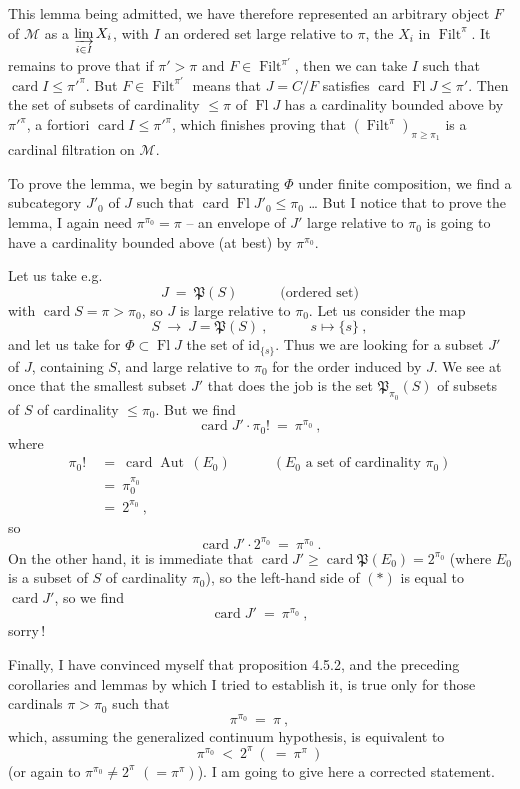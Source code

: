\documentclass[11pt]{article}
\newcommand{\printedpage}[1]{\marginpar{\footnotesize p.~#1}}
\newcommand{\msp}[1]{\marginpar{\footnotesize [#1]}}
\newcommand{\card}{\operatorname{card}}
\newcommand{\Fl}{\operatorname{Fl}}
\newcommand{\Filt}{\operatorname{Filt}}
\newcommand{\Aut}{\operatorname{Aut}}
\begin{document}
This lemma being admitted, we have therefore represented an arbitrary object $F$ of $\mathcal{M}$ as a $\varinjlim\limits_{i\in I} X_i$, with $I$ an ordered set large relative to $\pi$, the $X_i$ in $\Filt^{\pi}$. It remains to prove that if $\pi' > \pi$ and $F \in \Filt^{\pi'}$, then we can take $I$ such that $\card I \leqslant \pi'^{\pi}$. But $F \in \Filt^{\pi'}$ means that $J = C/F$ satisfies $\card\Fl J \leqslant \pi'$. Then the set of subsets of cardinality $\leqslant \pi$ of $\Fl J$ has a cardinality bounded above by $\pi'^{\pi}$, a fortiori $\card I \leqslant \pi'^{\pi}$, which finishes proving that $(\Filt^{\pi})_{\pi\geqslant\pi_1}$ is a cardinal filtration on $\mathcal{M}$.

\msp{page 114}

To prove the lemma, we begin by saturating $\Phi$ under finite composition, we find a subcategory $J'_0$ of $J$ such that $\card\Fl J'_0 \leqslant \pi_0$ \ldots{} But I notice that to prove the lemma, I again need $\pi^{\pi_0} = \pi$ -- an envelope of $J'$ large relative to $\pi_0$ is going to have a cardinality bounded above (at best) by $\pi^{\pi_0}$.

Let us take e.g.
\[
J \ =\ \mathfrak{P}(S) \qquad\quad \text{(ordered set)}
\]
with $\card S = \pi > \pi_0$, so $J$ is large relative to $\pi_0$. Let us consider the map
\[
S \ \longrightarrow\ J = \mathfrak{P}(S)\ , \qquad\quad s \longmapsto \{s\}\ ,
\]
and let us take for $\Phi \subset \Fl J$ the set of $\mathrm{id}_{\{s\}}$. Thus we are looking for a subset $J'$ of $J$, containing $S$, and large relative to $\pi_0$ for the order induced by $J$. We see at once that the smallest subset $J'$ that does the job is the set $\mathfrak{P}_{\pi_0}(S)$ of subsets of $S$ of cardinality $\leqslant \pi_0$. But we find
\[
\card J' \cdot \pi_0! \ =\ \pi^{\pi_0}\ ,
\]
\printedpage{33}
\msp{page 115}
where
\[
\begin{aligned}
\pi_0! \ &=\ \card\Aut\,(E_0) \qquad\quad (E_0 \text{ a set of cardinality } \pi_0)\\
&=\ \pi_0^{\pi_0}\\
&=\ 2^{\pi_0}\ ,
\end{aligned}
\]
so
\[
\card J' \cdot 2^{\pi_0} \ =\ \pi^{\pi_0}\ .
\tag*{$(*)$}
\]
On the other hand, it is immediate that $\card J' \geqslant \card\mathfrak{P}(E_0) = 2^{\pi_0}$ (where $E_0$ is a subset of $S$ of cardinality $\pi_0$), so the left-hand side of $(*)$ is equal to $\card J'$, so we find
\[
\card J' \ =\ \pi^{\pi_0}\ ,
\]
sorry\,!

Finally, I have convinced myself that proposition 4.5.2, and the preceding corollaries and lemmas by which I tried to establish it, is true only for those cardinals $\pi > \pi_0$ such that
\[
\pi^{\pi_0} \ =\ \pi\ ,
\]
which, assuming the generalized continuum hypothesis, is equivalent to
\[
\pi^{\pi_0} \ <\ 2^{\pi}\ (\ =\ \pi^{\pi}\ )
\]
(or again to $\pi^{\pi_0} \neq 2^{\pi}$ $(= \pi^{\pi})$). I am going to give
\msp{page 116}
here a corrected statement.
\end{document}
